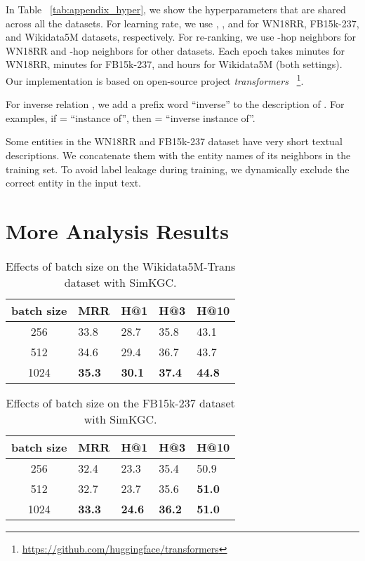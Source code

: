 \documentclass[11pt]{article}
\begin{document}
In Table ~\ref{tab:appendix_hyper},
we show the hyperparameters that are shared across all the datasets.
For learning rate,
we use , , and 
for WN18RR, FB15k-237, and Wikidata5M datasets, respectively.
For re-ranking,
we use -hop neighbors for WN18RR and -hop neighbors for other datasets.
Each epoch takes  minutes for WN18RR,
 minutes for FB15k-237,
and  hours for Wikidata5M (both settings).
Our implementation is based on open-source project \emph{transformers}
~\footnote{\url{https://github.com/huggingface/transformers}}.

For inverse relation ,
we add a prefix word ``inverse'' to the description of .
For examples,
if  = ``instance of'',
then  = ``inverse instance of''.

Some entities in the WN18RR and FB15k-237 dataset
have very short textual descriptions.
We concatenate them with the entity names of its neighbors in the training set.
To avoid label leakage during training,
we dynamically exclude the correct entity in the input text.

\section{More Analysis Results} \label{app:analysis}

\begin{table}[ht]
\centering
\begin{tabular}{c|llll}
\hline
batch size & MRR & H@1 & H@3 & H@10 \\ \hline
256 &  33.8 & 28.7 & 35.8 & 43.1 \\
512 & 34.6 & 29.4 & 36.7 & 43.7 \\
1024 & \textbf{35.3} & \textbf{30.1} & \textbf{37.4} & \textbf{44.8} \\ \hline
\end{tabular}
\caption{Effects of batch size on the Wikidata5M-Trans dataset with SimKGC.}
\label{tab:wiki5m_trans_batch_size}
\end{table}

\begin{table}[ht]
\centering
\begin{tabular}{c|llll}
\hline
batch size & MRR & H@1 & H@3 & H@10 \\ \hline
256 &  32.4 & 23.3 & 35.4 & 50.9 \\
512 & 32.7 & 23.7 & 35.6 & \textbf{51.0} \\
1024 & \textbf{33.3} & \textbf{24.6} & \textbf{36.2} & \textbf{51.0} \\ \hline
\end{tabular}
\caption{Effects of batch size on the FB15k-237 dataset with SimKGC.}
\label{tab:fb_batch_size}
\end{table}
\end{document}
